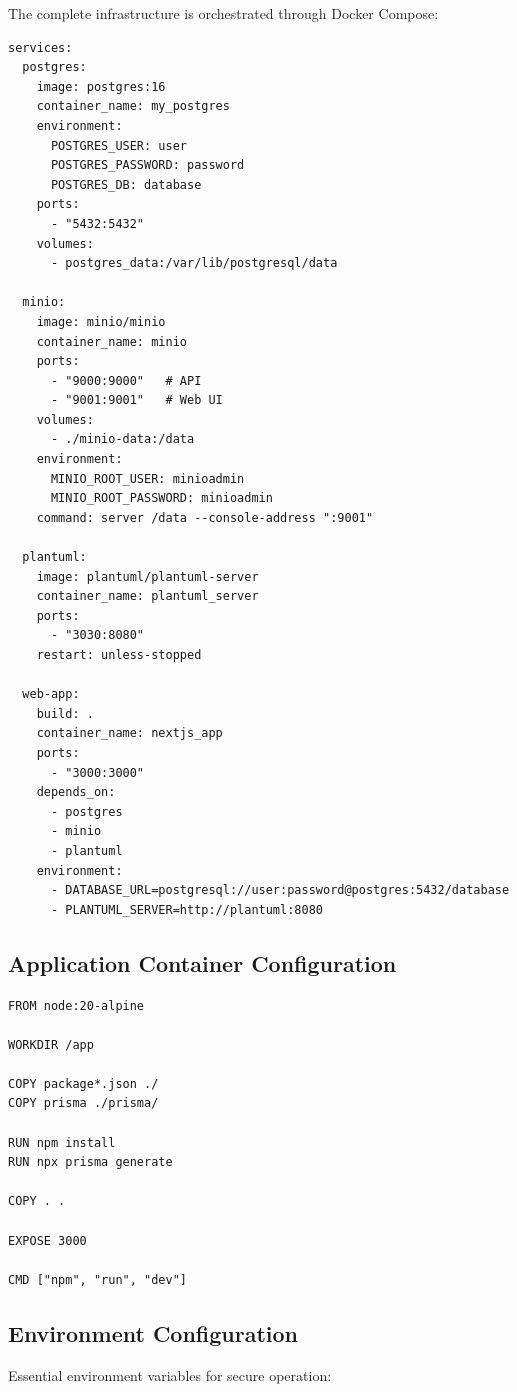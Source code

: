 The complete infrastructure is orchestrated through Docker Compose:

\begin{lstlisting}[caption=Docker Compose Services Configuration]
services:
  postgres:
    image: postgres:16
    container_name: my_postgres
    environment:
      POSTGRES_USER: user
      POSTGRES_PASSWORD: password
      POSTGRES_DB: database
    ports:
      - "5432:5432"
    volumes:
      - postgres_data:/var/lib/postgresql/data

  minio:
    image: minio/minio
    container_name: minio
    ports:
      - "9000:9000"   # API
      - "9001:9001"   # Web UI
    volumes:
      - ./minio-data:/data
    environment:
      MINIO_ROOT_USER: minioadmin
      MINIO_ROOT_PASSWORD: minioadmin
    command: server /data --console-address ":9001"

  plantuml:
    image: plantuml/plantuml-server
    container_name: plantuml_server
    ports:
      - "3030:8080"
    restart: unless-stopped

  web-app:
    build: .
    container_name: nextjs_app
    ports:
      - "3000:3000"
    depends_on:
      - postgres
      - minio
      - plantuml
    environment:
      - DATABASE_URL=postgresql://user:password@postgres:5432/database
      - PLANTUML_SERVER=http://plantuml:8080
\end{lstlisting}

\subsection{Application Container Configuration}

\begin{lstlisting}[caption=Next.js Application Dockerfile]
FROM node:20-alpine

WORKDIR /app

COPY package*.json ./
COPY prisma ./prisma/

RUN npm install
RUN npx prisma generate

COPY . .

EXPOSE 3000

CMD ["npm", "run", "dev"]
\end{lstlisting}

\subsection{Environment Configuration}

Essential environment variables for secure operation:


